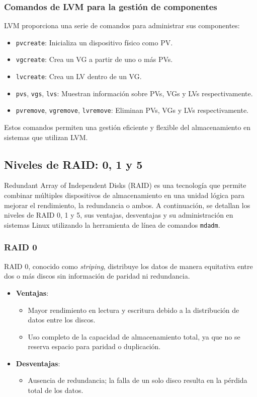 \subsubsection{Comandos de LVM para la gestión de componentes}

LVM proporciona una serie de comandos para administrar sus componentes:

\begin{itemize}
  \item \texttt{pvcreate}: Inicializa un dispositivo físico como PV.
  \item \texttt{vgcreate}: Crea un VG a partir de uno o más PVs.
  \item \texttt{lvcreate}: Crea un LV dentro de un VG.
  \item \texttt{pvs}, \texttt{vgs}, \texttt{lvs}: Muestran información sobre PVs, VGs y LVs respectivamente.
  \item \texttt{pvremove}, \texttt{vgremove}, \texttt{lvremove}: Eliminan PVs, VGs y LVs respectivamente.
\end{itemize}

Estos comandos permiten una gestión eficiente y flexible del almacenamiento en sistemas que utilizan LVM.

\subsection{Niveles de RAID: 0, 1 y 5}

Redundant Array of Independent Disks (RAID) es una tecnología que permite combinar múltiples dispositivos de almacenamiento en una unidad lógica para mejorar el rendimiento, la redundancia o ambos. A continuación, se detallan los niveles de RAID 0, 1 y 5, sus ventajas, desventajas y su administración en sistemas Linux utilizando la herramienta de línea de comandos \texttt{mdadm}.

\subsubsection{RAID 0}

RAID 0, conocido como \textit{striping}, distribuye los datos de manera equitativa entre dos o más discos sin información de paridad ni redundancia.

\begin{itemize}
  \item \textbf{Ventajas}:
    \begin{itemize}
      \item Mayor rendimiento en lectura y escritura debido a la distribución de datos entre los discos.
      \item Uso completo de la capacidad de almacenamiento total, ya que no se reserva espacio para paridad o duplicación.
    \end{itemize}
  \item \textbf{Desventajas}:
    \begin{itemize}
      \item Ausencia de redundancia; la falla de un solo disco resulta en la pérdida total de los datos.
    \end{itemize}
\end{itemize}

